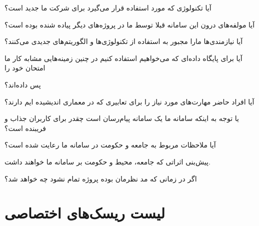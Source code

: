 
\begin{itemize}

	

	 آیا تکنولوژی که مورد استفاده قرار می‌گیرد برای شرکت ما جدید است؟

	

	 آیا مولفه‌های درون این سامانه قبلا توسط ما در پروژه‌های دیگر پیاده شنده بوده است؟

	

	 آیا نیازمندی‌ها مارا مجبور به استفاده از تکنولوژی‌ها و الگوریتم‌های جدیدی می‌کنند؟

	 آیا برای پایگاه داده‌ای که می‌خواهیم استفاده کنیم در چنین زمینه‌هایی مشابه کار ما امتحان خود را 

	پس داده‌اند؟

	

\end{itemize}




\begin{itemize}

	

	 آیا افراد حاضر مهارت‌های مورد نیاز را برای تعابیری که در معماری اندیشیده ایم دارند؟

	

	 یا توجه به اینکه سامانه ما یک سامانه پیام‌رسان است چقدر برای کاربران جذاب و فریبنده است؟

	

	 آیا ملاحظات مربوط به جامعه و حکومت در سامانه ما رعایت شده است؟

	 پیش‌بنی اثراتی که جامعه، محیط و حکومت بر سامانه ما خواهند داشت.

	

	 اگر در زمانی که مد نظرمان بوده پروژه تمام نشود چه خواهد شد؟

	

\end{itemize}

\section{لیست ریسک‌های اختصاصی}





